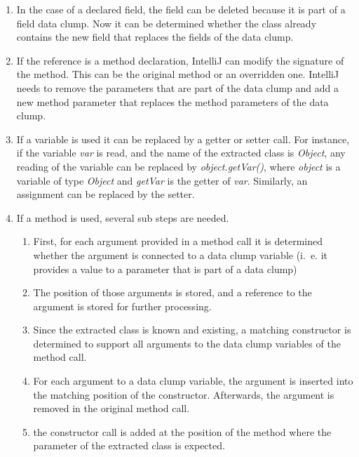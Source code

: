 \begin{enumerate}
    \item In the case of a declared field, the field can be deleted because it is part of a field data clump. Now it can be determined whether the class already contains the new field that replaces the fields of the data clump.
    \item If the reference is a method declaration, IntelliJ can modify the signature of the method. This can be the original method or an overridden one. IntelliJ needs to remove the parameters that are part of the data clump and add a new method parameter that replaces the method parameters of the data clump. 
    \item If a variable is used it can be replaced by a getter or setter call. For instance, if the variable \textit{var} is read, and the name of the extracted class is \textit{Object}, any reading of the variable can be replaced by  \textit{object.getVar()}, where \textit{object} is a variable of type \textit{Object} and \textit{getVar} is the getter of \textit{var}. Similarly, an assignment can be replaced by the setter.
    \item If a method is used, several sub steps are needed.
    \begin{enumerate}
        \item First, for each argument provided in a method call it is determined whether the argument is connected to a data clump variable (i.~e. it provides a value to a parameter that is part of a data clump) 
        \item The position of those arguments is stored, and a reference to the argument is stored for further processing.
        \item Since the extracted class is known and existing, a matching constructor is determined to support all arguments to the data clump variables of the method call. 
        \item For each argument to a data clump variable, the argument is inserted into the matching position of the constructor. Afterwards,  the argument is removed in the original method call. 
        \item the constructor call is added at the position of the method  where the parameter of the extracted class is expected. 
        
    \end{enumerate}
    
\end{enumerate}

